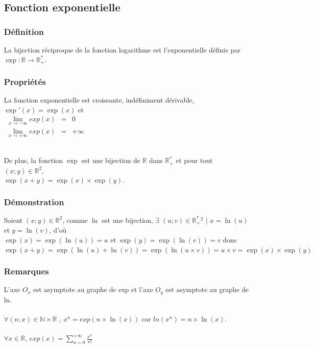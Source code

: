 \documentclass[a4paper,10pt]{book}
\newcommand{\R}{\mathbb{R}}
\newcommand{\Rpe}{\mathbb{R}_{+}^{*}}
\newcommand{\N}{\mathbb{N}}
\begin{document}
\subsection{Fonction exponentielle}
\subsubsection{Définition}
La bijection réciproque de la fonction logarithme est l'exponentielle définie par $\exp : \R \longrightarrow \Rpe$.\\

\subsubsection{Propriétés}
La fonction exponentielle est croissante, indéfiniment dérivable, $\exp'(x)=\exp(x)$ et\\
\begin{math} \begin{array}{rcl}
\underset{x \rightarrow -\infty}{\lim} exp(x)&=& 0 \\
\underset{x \rightarrow +\infty}{\lim} exp(x)&=& +\infty \\\\\\
\end{array} \end{math}

De plus, la fonction $\exp$ est une bijection de $ \R $ dans $\Rpe$ et pour tout $(x ; y) \in  \R^{2}$,\\ $\exp(x+y)=\exp(x)\times\exp(y)$.\\

\subsubsection{Démonstration}
Soient $(x;y) \in \R^{2}$, comme $\ln$ est une bijection, $\exists$ $(u;v) \in \Rpe {}^{2}$ $|$ $x=\ln(u)$ et $y=\ln(v)$, d'où\\
$\exp(x)=\exp(\ln(u))=u$ et $\exp(y)=\exp(\ln(v))=v$ donc\\
$\exp(x+y)=\exp(\ln(u)+\ln(v))=\exp(\ln(u\times v))= u\times v =\exp(x)\times\exp(y)$\\

\subsubsection{Remarques}
L'axe $O_{x}$ est asymptote au graphe de exp et l'axe $O_{y}$ est asymptote au graphe de ln.\\\\
$\forall (n;x) \in \N \times \R$ , $x^{n}=exp(n\times\ln(x))$ car $ln(x^{n})=n\times\ln(x)$.\\\\
$\forall x \in \R$, $exp(x)=\sum\limits_{n=0}^{+\infty} \frac{x^{n}}{n!}$\\
\end{document}
